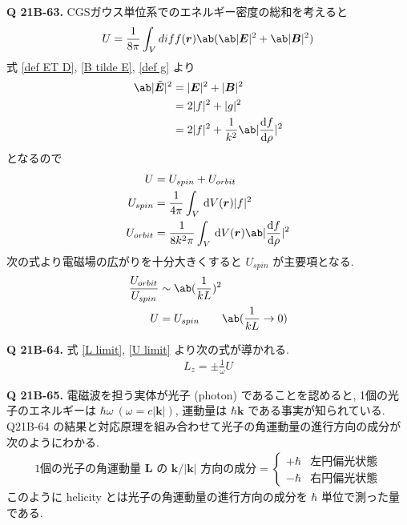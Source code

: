 \documentclass[uplatex,dvipdfmx,a4paper,11pt]{jlreq}
\newcommand{\EE}{\bm{E}}
\newcommand{\BB}{\bm{B}}
\newcommand{\rr}{\bm{r}}
\newcommand{\kk}{\bm{k}}
\newcommand{\ET}{\tilde{\bm{E}}}
\newcommand{\LL}{\bm{L}}
\theoremstyle{definition}
\begin{document}
\textbf{Q 21B-63.}
CGSガウス単位系でのエネルギー密度の総和を考えると
\begin{align}
  U = \frac{1}{8\pi}\int_Vdiff(\rr)\ab(\ab|\EE|^2 + \ab|\BB|^2)
\end{align}
式 \eqref{def ET D}, \eqref{B tilde E}, \eqref{def g} より
\begin{align}
  \ab|\ET|^2 & = |\EE|^2 + |\BB|^2                           \\
             & = 2|f|^2 + |g|^2                              \\
             & = 2|f|^2 + \frac{1}{k^2}\ab|\diff{f}{\rho}|^2
\end{align}
となるので
\begin{align}
  U         & = U_{spin} + U_{orbit}                                   \\
  U_{spin}  & = \frac{1}{4\pi}\int_V\dl V(\rr)|f|^2                    \\
  U_{orbit} & = \frac{1}{8k^2\pi}\int_V\dl V(\rr)\ab|\diff{f}{\rho}|^2 \\
\end{align}
次の式より電磁場の広がりを十分大きくすると $U_{spin}$ が主要項となる.
\begin{align}
  \frac{U_{orbit}}{U_{spin}} & \sim \ab(\frac{1}{kL})^2                                                \\
  U                          & = U_{spin}                \qquad \ab(\frac{1}{kL}\to 0) \label{U limit}
\end{align}

\textbf{Q 21B-64.}
式 \eqref{L limit}, \eqref{U limit} より次の式が導かれる.
\begin{align}
  L_z = \pm\frac{1}{\omega}U
\end{align}

\textbf{Q 21B-65.}
電磁波を担う実体が光子 (photon) であることを認めると, 1個の光子のエネルギーは $\hbar\omega\ (\omega = c|\kk|)$, 運動量は $\hbar\kk$ である事実が知られている. Q21B-64 の結果と対応原理を組み合わせて光子の角運動量の進行方向の成分が次のようにわかる.
\begin{align}
  \textrm{1個の光子の角運動量 $\LL$ の $\kk/|\kk|$ 方向の成分} =
  \begin{cases}
    +\hbar & 左円偏光状態 \\
    -\hbar & 右円偏光状態
  \end{cases}
\end{align}
このように helicity とは光子の角運動量の進行方向の成分を $\hbar$ 単位で測った量である.
\end{document}

